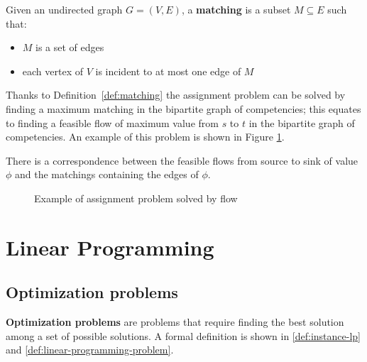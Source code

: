 \documentclass[english]{article}
\begin{document}
\bigskip
\begin{definition}[Matching]
  Given an undirected graph \(G = \left( V, E \right)\), a \textbf{matching} is a subset \(M \subseteq E\) such that:
  \begin{itemize}
    \item \(M\) is a set of edges
    \item each vertex of \(V\) is incident to at most one edge of \(M\)
  \end{itemize}
  \label{def:matching}
\end{definition}

Thanks to Definition~\ref{def:matching} the assignment problem can be solved by finding a maximum matching in the bipartite graph of competencies;
this equates to finding a feasible flow of maximum value from \(s\) to \(t\) in the bipartite graph of competencies.
An example of this problem is shown in Figure \ref{fig:assignment-flow-example}.

There is a correspondence between the feasible flows from source to sink of value \(\phi\) and the matchings containing the edges of \(\phi\).

\begin{figure}[htbp]
  \bigskip
  \centering
  \caption{Example of assignment problem solved by flow}
  \label{fig:assignment-flow-example}
  \bigskip
\end{figure}

\clearpage

\section{Linear Programming}
\label{sec:linear-programming}

\subsection{Optimization problems}

\textbf{Optimization problems} are problems that require finding the best solution among a set of possible solutions.
A formal definition is shown in \ref{def:instance-lp} and \ref{def:linear-programming-problem}.
\end{document}
